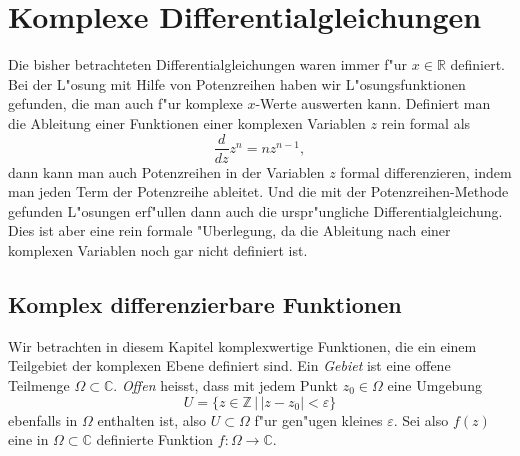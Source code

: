 %
%
%
\chapter{Komplexe Differentialgleichungen\label{chapter:komplexeanalysis}}
\rhead{}
Die bisher betrachteten Differentialgleichungen waren immer f"ur
$x\in\mathbb R$ definiert.
Bei der L"osung mit Hilfe von Potenzreihen haben wir L"osungsfunktionen
gefunden, die man auch f"ur komplexe $x$-Werte auswerten kann.
Definiert man die Ableitung einer Funktionen einer komplexen Variablen
$z$ rein formal als
\[
\frac{d}{dz}z^n= nz^{n-1},
\]
dann kann man auch Potenzreihen in der Variablen $z$ formal differenzieren,
indem man jeden Term der Potenzreihe ableitet.
Und die mit der Potenzreihen-Methode gefunden L"osungen erf"ullen dann
auch die urspr"ungliche Differentialgleichung.
Dies ist aber eine rein formale "Uberlegung, da die Ableitung nach einer
komplexen Variablen noch gar nicht definiert ist.

%
%
\section{Komplex differenzierbare Funktionen}
Wir betrachten in diesem Kapitel komplexwertige Funktionen,
%
die ein einem Teilgebiet der komplexen Ebene definiert sind.
Ein {\em Gebiet} ist eine offene Teilmenge $\Omega\subset \mathbb C$.
%
{\em Offen} heisst, dass mit jedem Punkt $z_0\in\Omega$ eine Umgebung
%
%
\[
U=\{z\in\mathbb Z\,|\,|z-z_0|<\varepsilon\}
\]
ebenfalls in $\Omega$ enthalten ist, also $U\subset \Omega$ f"ur gen"ugen
kleines $\varepsilon$.
Sei also $f(z)$ eine in $\Omega\subset\mathbb C$ definierte
Funktion $f\colon\Omega\to\mathbb C$. 

